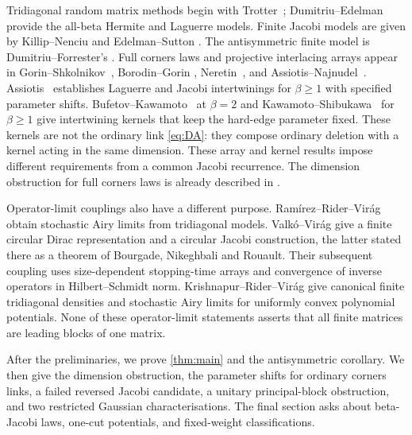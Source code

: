 \documentclass[10pt]{amsart}
\begin{document}
Tridiagonal random matrix methods begin with Trotter~\cite{Trotter};
Dumitriu--Edelman~\cite{DE} provide the all-beta Hermite and Laguerre
models. Finite Jacobi models are given by Killip--Nenciu
\cite[Theorem~2]{KN} and Edelman--Sutton
\cite[Definitions~1.6, 1.8 and Theorem~4.1]{ES}.
The antisymmetric finite model is Dumitriu--Forrester's
\cite[equation~(1.4) and Theorem~1.1]{DF}.
Full corners laws and projective interlacing arrays appear in
Gorin--Shkolnikov~\cite[Definition~1.1]{GS}, Borodin--Gorin
\cite[Definition~1.1]{BG}, Neretin~\cite[Theorem~1.3]{Neretin},
and Assiotis--Najnudel~\cite[Theorems~1.13 and 1.16]{AN}.
Assiotis~\cite[Theorem~1.1 and Corollary~1.4]{Assiotis} establishes
Laguerre and Jacobi intertwinings for $\beta\geq1$ with specified
parameter shifts. Bufetov--Kawamoto~\cite{BK} at $\beta=2$ and
Kawamoto--Shibukawa~\cite[equation~(1.6) and Theorems~1.7--1.8]{KS}
for $\beta\geq1$ give intertwining kernels that keep the hard-edge
parameter fixed. These kernels are not the ordinary link
\eqref{eq:DA}: they compose ordinary deletion with a kernel acting in
the same dimension. These array and kernel results impose different
requirements from a common Jacobi recurrence. The dimension obstruction
for full corners laws is already described in \cite[Section~1.5]{BG}.

Operator-limit couplings also have a different purpose.
Ram\'irez--Rider--Vir\'ag~\cite{RRV} obtain stochastic Airy limits
from tridiagonal models. Valk\'o--Vir\'ag
\cite[Proposition~20 and Theorem~21]{VVSine} give a finite circular
Dirac representation and a circular Jacobi construction, the latter
stated there as a theorem of Bourgade, Nikeghbali and Rouault.
Their subsequent coupling \cite[Theorem~1]{VVCirc} uses size-dependent
stopping-time arrays and convergence of inverse operators in
Hilbert--Schmidt norm. Krishnapur--Rider--Vir\'ag
\cite[Proposition~2 and Theorem~1]{KRV} give canonical finite
tridiagonal densities and stochastic Airy limits for uniformly convex
polynomial potentials. None of these operator-limit statements asserts
that all finite matrices are leading blocks of one matrix.

After the preliminaries, we prove \cref{thm:main} and the antisymmetric
corollary. We then give the dimension obstruction, the parameter shifts
for ordinary corners links, a failed reversed Jacobi candidate, a
unitary principal-block obstruction, and two restricted Gaussian
characterisations. The final section asks about beta-Jacobi laws,
one-cut potentials, and fixed-weight classifications.
\end{document}
